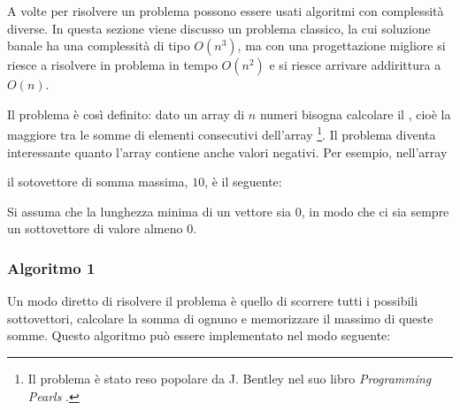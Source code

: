 
A volte per risolvere un problema
possono essere usati algoritmi
con complessità diverse.
In questa sezione viene discusso un problema classico,
la cui soluzione banale ha una complessità di tipo $O(n^3)$,
ma con una progettazione migliore si riesce a risolvere in problema
in tempo $O(n^2)$ e si riesce arrivare addirittura a $O(n)$.

Il problema è così definito: dato un array di 
$n$ numeri bisogna calcolare il ,
cioè la maggiore tra le somme di elementi consecutivi dell'array
\footnote{Il problema è stato reso popolare da J. Bentley nel suo libro
\emph{Programming Pearls} \cite{ben86}.}.
Il problema diventa interessante quanto l'array contiene 
anche valori negativi.
Per esempio, nell'array
\begin{center}
\end{center}
\begin{samepage}
il sotovettore di somma massima, $10$, è il seguente:
\begin{center}
\end{center}
\end{samepage}

Si assuma che la lunghezza minima di un vettore sia 0,
in modo che ci sia sempre un sottovettore di valore 
almeno 0.

\subsubsection{Algoritmo 1}

Un modo diretto di risolvere il problema 
è quello di scorrere tutti i possibili
sottovettori, calcolare la somma di ognuno e memorizzare
il massimo di queste somme.
Questo algoritmo può essere implementato nel modo seguente:

